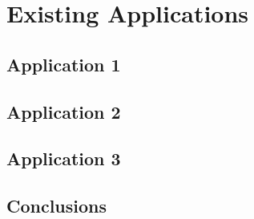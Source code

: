 \section{Existing Applications}

\subsection{Application 1}

\subsection{Application 2}

\subsection{Application 3}

\subsection{Conclusions}

